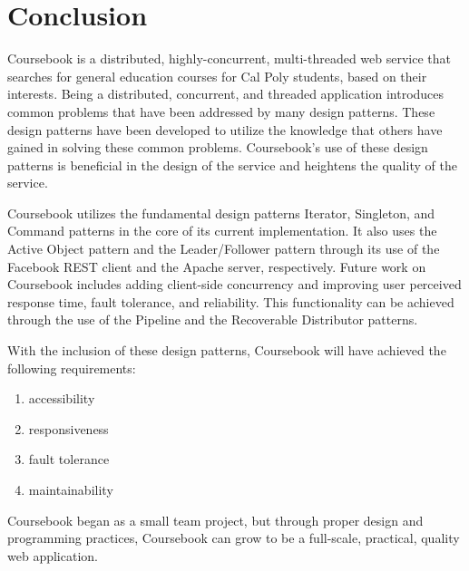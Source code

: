 \section{Conclusion}

Coursebook is a distributed, highly-concurrent, multi-threaded web service that
searches for general education courses for Cal Poly students, based on their
interests. Being a distributed, concurrent, and threaded application introduces
common problems that have been addressed by many design patterns. These design
patterns have been developed to utilize the knowledge that others have gained in
solving these common problems. Coursebook's use of these design patterns is
beneficial in the design of the service and heightens the quality of the
service.

Coursebook utilizes the fundamental design patterns Iterator, Singleton, and
Command patterns in the core of its current implementation. It also uses the
Active Object pattern and the Leader/Follower pattern through its use of the
Facebook REST client and the Apache server, respectively. Future work on
Coursebook includes adding client-side concurrency and improving user perceived
response time, fault tolerance, and reliability. This functionality can be
achieved through the use of the Pipeline and the Recoverable Distributor
patterns.

With the inclusion of these design patterns, Coursebook will have achieved the
following requirements:

\singlespacing
\begin{enumerate}
\item accessibility
\item responsiveness
\item fault tolerance
\item maintainability
\end{enumerate}

Coursebook began as a small team project, but through proper design and
programming practices, Coursebook can grow to be a full-scale, practical,
quality web application.
